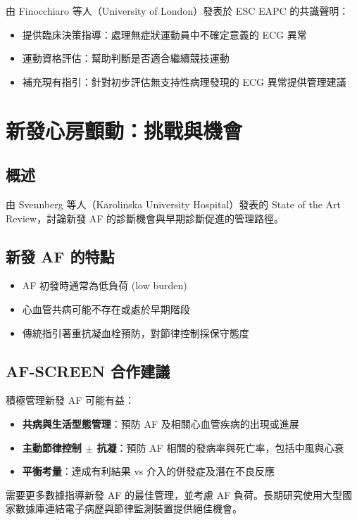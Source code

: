 \documentclass[12pt,a4paper]{article}
\newcommand{\note}[1]{
    \par
    \noindent
    \begin{tcolorbox}[
        colback=emergency_blue!5!white,
        colframe=emergency_blue,
        title=\textbf{重點提醒},
        fonttitle=\bfseries,
        boxrule=0.5pt,
        arc=3pt,
        left=6pt,
        right=6pt,
        top=6pt,
        bottom=6pt
    ]
    #1
    \end{tcolorbox}
}
\begin{document}
由 Finocchiaro 等人（University of London）發表於 ESC EAPC 的共識聲明：
\begin{itemize}
    \item 提供臨床決策指導：處理無症狀運動員中不確定意義的 ECG 異常
    \item 運動資格評估：幫助判斷是否適合繼續競技運動
    \item 補充現有指引：針對初步評估無支持性病理發現的 ECG 異常提供管理建議
\end{itemize}

\section{新發心房顫動：挑戰與機會}

\subsection{概述}

由 Svennberg 等人（Karolinska University Hospital）發表的 State of the Art Review，討論新發 AF 的診斷機會與早期診斷促進的管理路徑。

\subsection{新發 AF 的特點}
\begin{itemize}
    \item AF 初發時通常為低負荷 (low burden)
    \item 心血管共病可能不存在或處於早期階段
    \item 傳統指引著重抗凝血栓預防，對節律控制採保守態度
\end{itemize}

\subsection{AF-SCREEN 合作建議}

積極管理新發 AF 可能有益：
\begin{itemize}
    \item \textbf{共病與生活型態管理}：預防 AF 及相關心血管疾病的出現或進展
    \item \textbf{主動節律控制 $\pm$ 抗凝}：預防 AF 相關的發病率與死亡率，包括中風與心衰
    \item \textbf{平衡考量}：達成有利結果 vs 介入的併發症及潛在不良反應
\end{itemize}

\note{
需要更多數據指導新發 AF 的最佳管理，並考慮 AF 負荷。長期研究使用大型國家數據庫連結電子病歷與節律監測裝置提供絕佳機會。
}
\end{document}
